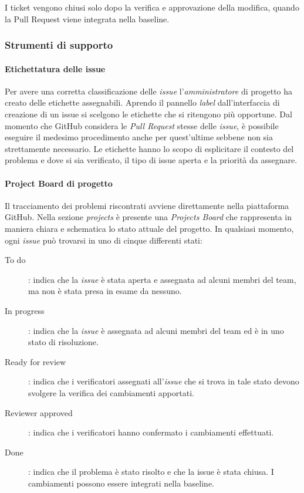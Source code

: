 \documentclass[../../norme-di-progetto.tex]{subfiles}
\begin{document}
I ticket vengono chiusi solo dopo la verifica e approvazione della modifica, quando la Pull Request viene integrata nella baseline.

\subsubsection{Strumenti di supporto}%
\label{subs:risoluzione_dei_problemi/strumenti_di_supporto}

\paragraph{Etichettatura delle issue}%
\label{par:etichettatura_delle_issue}

Per avere una corretta classificazione delle \textit{issue} l'\textit{amministratore} di progetto ha creato delle etichette assegnabili.
Aprendo il pannello \textit{label} dall'interfaccia di creazione di un issue si scelgono le etichette che si ritengono più opportune. Dal momento che GitHub considera le \textit{Pull Request} stesse delle \textit{issue}, è possibile eseguire il medesimo procedimento anche per quest'ultime sebbene non sia strettamente necessario.
Le etichette hanno lo scopo di esplicitare il contesto del problema e dove si sia verificato, il tipo di issue aperta e la priorità da assegnare.

\paragraph{Project Board di progetto}%
\label{par:risoluzione_dei_problemi/project_board_di_progetto}

Il tracciamento dei problemi riscontrati avviene direttamente nella piattaforma GitHub.
Nella sezione \textit{projects} è presente una \textit{Projects Board} che rappresenta in maniera chiara e schematica lo stato attuale del progetto.
In qualsiasi momento, ogni \textit{issue} può trovarsi in uno di cinque differenti stati:
\begin{description}
  \item [To do]: indica che la \textit{issue} è stata aperta e assegnata ad alcuni membri del team, ma non è stata presa in esame da nessuno.
  \item [In progress]: indica che la \textit{issue} è assegnata ad alcuni membri del team ed è in uno stato di risoluzione.
  \item [Ready for review]: indica che i verificatori assegnati all'\textit{issue} che si trova in tale stato devono svolgere la verifica dei cambiamenti apportati.
  \item [Reviewer approved]: indica che i verificatori hanno confermato i cambiamenti effettuati.
  \item [Done]: indica che il problema è stato risolto e che la issue è stata chiusa. I cambiamenti possono essere integrati nella baseline.
\end{description}
\end{document}

